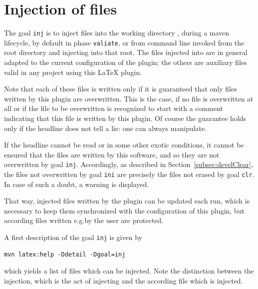 \section{Injection of files}\label{sec:injFiles}

The goal \texttt{inj} is to inject files 
into the working directory , 
during a maven lifecycle, by default in phase \texttt{valiate}, 
or from command line invoked from the root directory and injecting into that root. 
The files injected into  
are in general adapted to the current configuration of the plugin; 
the others are auxiliary files valid in any project using this \LaTeX{} plugin. 

Note that each of these files is written only 
if it is guaranteed that only files written by this plugin are overwritten. 
This is the case, if no file is overwritten at all 
or if the file to be overwritten is recognized to start with a comment 
indicating that this file is written by this plugin. 
Of course the guarantee holds only if the headline does not tell a lie: 
one can always manipulate. 

If the headline cannot be read or in some other exotic conditions, 
it cannot be ensured that the files are written by this software, 
and so they are not overwritten by goal \texttt{inj}. 
Accordingly, as described in Section~\ref{subsec:develClear}, 
the files not overwritten by goal \texttt{ini} 
are precisely the files not erased by goal \texttt{clr}. 
In case of such a doubt, a warning is displayed. 

That way, injected files written by the plugin can be updated each run, 
which is necessary to keep them synchronized 
with the configuration of this plugin, 
but according files written e.g.\@ by the user are protected. 

A first description of the goal \texttt{inj} is given by 
%
\begin{verbatim}
mvn latex:help -Ddetail -Dgoal=inj
\end{verbatim}
%
which yields a list of files which can be injected. 
Note the distinction between the injection, which is the act of injecting 
and the according file which is injected. 

